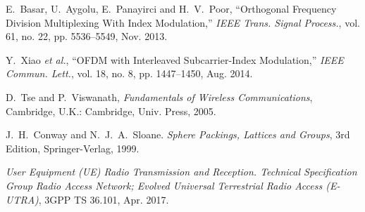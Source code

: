 \documentclass{sbrt2018port}
\begin{document}
\begin{thebibliography}{99}
E.~Basar, U.~Aygolu, E.~Panayirci and H.~V.~Poor, ``Orthogonal Frequency Division Multiplexing With Index Modulation,'' \emph{IEEE Trans. Signal Process.}, vol. 61, no. 22, pp. 5536--5549, Nov. 2013.

Y.~Xiao \emph{et al.}, ``OFDM with Interleaved Subcarrier-Index Modulation,'' \emph{IEEE Commun. Lett.}, vol. 18, no. 8, pp. 1447--1450, Aug. 2014.


D.~Tse and P.~Viswanath, \emph{Fundamentals of Wireless Communications}, Cambridge, U.K.: Cambridge, Univ. Press, 2005.

J.~H.~Conway and N.~J.~A.~Sloane. \emph{Sphere Packings, Lattices and Groups}, 3rd Edition, Springer-Verlag, 1999.

\emph{User Equipment ({UE}) Radio Transmission and Reception. Technical Specification Group Radio Access Network; Evolved Universal Terrestrial \hspace*{0.55cm} 
Radio Access ({E-UTRA})}, 3GPP TS 36.101, Apr. 2017. 

\end{thebibliography}
\end{document}
